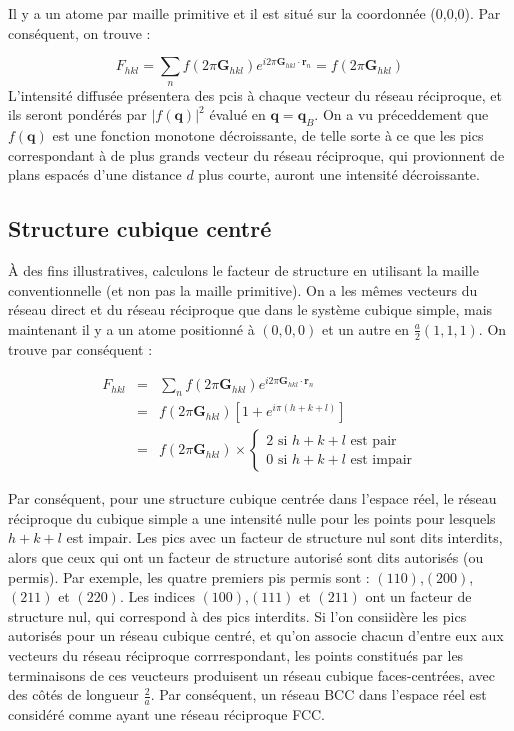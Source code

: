 Il y a un atome par maille primitive et il est situé sur la coordonnée (0,0,0).
Par conséquent, on trouve :

\begin{equation}
    F_{hkl} = \sum_n f(2\pi \mathbf{G}_{hkl}) e^{i 2\pi \mathbf{G}_{hkl}\cdot\mathbf{r}_n } = f(2\pi\mathbf{G}_{hkl})
\end{equation}
L'intensité diffusée présentera des pcis à chaque vecteur du réseau réciproque,
et ils seront pondérés par $|f(\mathbf{q})|^2$ évalué en $\mathbf{q = q}_B$. On a
vu préceddement que $f(\mathbf{q})$ est une fonction monotone décroissante,
de telle sorte à ce que les pics correspondant à de plus grands vecteur du
réseau réciproque, qui provionnent de plans espacés d'une distance $d$ plus
courte, auront une intensité décroissante.
\subsection{Structure cubique centré}

À des fins illustratives, calculons le facteur de structure en utilisant la
maille conventionnelle (et non pas la maille primitive). On a les mêmes vecteurs
du réseau direct et du réseau réciproque que dans le système cubique simple, mais
maintenant il y a un atome positionné à $(0,0,0)$ et un autre en
$\frac{a}{2}(1,1,1)$. On trouve par conséquent :

\begin{eqnarray}
    F_{hkl} & = & \sum_n f(2\pi\mathbf{G}_{hkl}) e^{i 2\pi \mathbf{G}_{hkl}\cdot\mathbf{r}_n} \\
    & = & f(2\pi \mathbf{G}_{hkl}) [1 + e^{i\pi(h+k+l)}] \\
    & = & f(2\pi \mathbf{G}_{hkl}) \times \begin{cases} 2 \text{ si } h+k+l \text{ est pair}\\ 0 \text{ si } h+k+l \text{ est impair}\end{cases}
\end{eqnarray}

Par conséquent, pour une structure cubique centrée dans l'espace réel, le réseau 
réciproque du cubique simple a une intensité nulle pour les points pour lesquels
$h + k + l$ est impair. Les pics avec un facteur de structure nul sont dits
interdits, alors que ceux qui ont un facteur de structure autorisé sont dits
autorisés (ou permis). Par exemple, les quatre premiers pis permis sont :
$(110)$,$(200)$,$(211)$ et $(220)$. Les indices $(100)$,$(111)$ et $(211)$ ont un
facteur de structure nul, qui correspond à des pics interdits. Si l'on consiidère
les pics autorisés pour un réseau cubique centré, et qu'on associe chacun d'entre
eux aux vecteurs du réseau réciproque corrrespondant, les points constitués par
les terminaisons de ces veucteurs produisent un réseau cubique faces-centrées,
avec des côtés de longueur $\frac{2}{a}$. Par conséquent, un réseau BCC dans
l'espace réel est considéré comme ayant une réseau réciproque FCC. 


